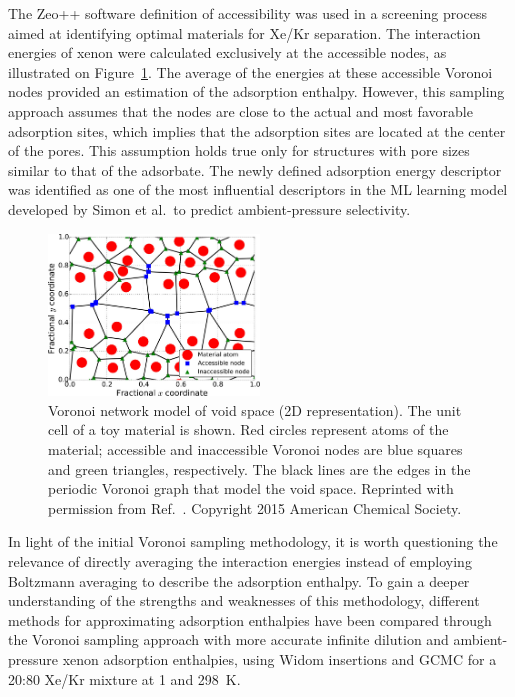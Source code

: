 \documentclass[main]{subfiles}
\begin{document}
The Zeo++ software definition of accessibility was used in a screening process aimed at identifying optimal materials for Xe/Kr separation.\autocite{Simon_2015} The interaction energies of xenon were calculated exclusively at the accessible nodes, as illustrated on Figure~\ref{fgr:simon_voro}. The average of the energies at these accessible Voronoi nodes provided an estimation of the adsorption enthalpy. However, this sampling approach assumes that the nodes are close to the actual and most favorable adsorption sites, which implies that the adsorption sites are located at the center of the pores. This assumption holds true only for structures with pore sizes similar to that of the adsorbate. The newly defined adsorption energy descriptor was identified as one of the most influential descriptors in the ML learning model developed by Simon et al.\ to predict ambient-pressure selectivity.

\begin{figure}[ht]
  \centering
  \includegraphics[width=0.5\textwidth]{figures/3-fastsim/Simon_voronoi.jpeg}
  \caption{Voronoi network model of void space (2D representation). The unit cell of a toy material is shown. Red circles represent atoms of the material; accessible and inaccessible Voronoi nodes are blue squares and green triangles, respectively. The black lines are the edges in the periodic Voronoi graph that model the void space. Reprinted with permission from Ref.~\cite{Simon_2015}. Copyright 2015 American Chemical Society.}\label{fgr:simon_voro}
\end{figure}

In light of the initial Voronoi sampling methodology, it is worth questioning the relevance of directly averaging the interaction energies instead of employing Boltzmann averaging to describe the adsorption enthalpy. To gain a deeper understanding of the strengths and weaknesses of this methodology, different methods for approximating adsorption enthalpies have been compared through the Voronoi sampling approach with more accurate infinite dilution and ambient-pressure xenon adsorption enthalpies, using Widom insertions and GCMC for a 20:80 Xe/Kr mixture at \SI{1}{\atm} and \SI{298}{\kelvin}.
\end{document}
